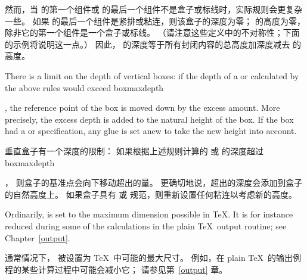 \documentclass[twoside,letterpaper]{rapport3}
\begin{document}
然而，当  的第一个组件或  的最后一个组件不是盒子或标线时，实际规则会更复杂一些。
如果  的最后一个组件是紧排或粘连，则该盒子的深度为零； 的高度为零，除非它的第一个组件是一个盒子或标线。
（请注意这些定义中的不对称性；下面的示例将说明这一点。）
因此， 的深度等于所有封闭内容的总高度加深度减去  的高度。

There is a limit on the depth of vertical boxes:
if the depth of a  or 
calculated by the above rules would exceed
\cstoidx boxmaxdepth\par,
the reference point of the box
is moved down by the excess amount. 
More precisely, the excess depth is added to the 
natural height of the box. If the box had a  or
 specification, any glue is set anew to take
the new height into account.

垂直盒子有一个深度的限制：
如果根据上述规则计算的  或  的深度超过 \cstoidx boxmaxdepth\par，
则盒子的基准点会向下移动超出的量。
更确切地说，超出的深度会添加到盒子的自然高度上。
如果盒子具有  或  规范，则重新设置任何粘连以考虑新的高度。

Ordinarily,
 is set to the maximum dimension
possible in \TeX. It is for instance reduced during some of
the calculations  in the plain \TeX\ output routine;
see Chapter~\ref{output}.

通常情况下， 被设置为 \TeX\ 中可能的最大尺寸。
例如，在 plain \TeX\ 的输出例程的某些计算过程中可能会减小它；
请参见第~\ref{output} 章。
\end{document}
